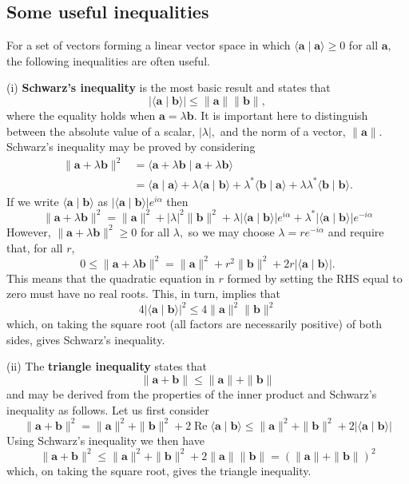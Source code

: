 \documentclass[12pt]{book}
\theoremstyle{definition}\newtheorem{dfn}{Définition}[chapter]
\theoremstyle{plain}\newtheorem{thm}{Théorème}[chapter]
\theoremstyle{plain}\newtheorem{prp}{Proposition}[chapter]
\theoremstyle{plain}\newtheorem{lem}{\bf Lemme}[chapter]
\theoremstyle{plain}\newtheorem{axm}{\bf Axiome}[chapter]
\theoremstyle{plain}\newtheorem{lmm}{\bf Lemme}[chapter]
\theoremstyle{plain}\newtheorem{cor}{\bf Corollaire}[chapter]
\theoremstyle{remark}\newtheorem{rem}{Remarque}[chapter]
\begin{document}
\subsection{Some useful inequalities}
For a set of vectors forming a linear vector space in which $\langle\mathbf{a} \mid \mathbf{a}\rangle \geq 0$ for all $\mathbf{a},$ the following inequalities are often useful.

(i) {\bf Schwarz's inequality} is the most basic result and states that
$$
|\langle\mathbf{a} \mid \mathbf{b}\rangle| \leq\|\mathbf{a}\|\|\mathbf{b}\|,
$$
where the equality holds when $\mathbf{a}=\lambda \mathbf{b}$. It is important here to distinguish between the absolute value of a scalar, $|\lambda|,$ and the norm of a vector, $\|\mathbf{a}\| .$ Schwarz's inequality may be proved by considering
$$
\begin{aligned}
\|\mathbf{a}+\lambda \mathbf{b}\|^{2} &=\langle\mathbf{a}+\lambda \mathbf{b} \mid \mathbf{a}+\lambda \mathbf{b}\rangle \\
&=\langle\mathbf{a} \mid \mathbf{a}\rangle+\lambda\langle\mathbf{a} \mid \mathbf{b}\rangle+\lambda^{*}\langle\mathbf{b} \mid \mathbf{a}\rangle+\lambda \lambda^{*}\langle\mathbf{b} \mid \mathbf{b}\rangle .
\end{aligned}
$$
If we write $\langle\mathbf{a} \mid \mathbf{b}\rangle$ as $|\langle\mathbf{a} \mid \mathbf{b}\rangle| e^{i \alpha}$ then
$$
\|\mathbf{a}+\lambda \mathbf{b}\|^{2}=\|\mathbf{a}\|^{2}+|\lambda|^{2}\|\mathbf{b}\|^{2}+\lambda|\langle\mathbf{a} \mid \mathbf{b}\rangle| e^{i \alpha}+\lambda^{*}|\langle\mathbf{a} \mid \mathbf{b}\rangle| e^{-i \alpha}
$$
However, $\|\mathbf{a}+\lambda \mathbf{b}\|^{2} \geq 0$ for all $\lambda,$ so we may choose $\lambda=r e^{-i \alpha}$ and require that, for all $r$,
$$
0 \leq\|\mathbf{a}+\lambda \mathbf{b}\|^{2}=\|\mathbf{a}\|^{2}+r^{2}\|\mathbf{b}\|^{2}+2 r|\langle\mathbf{a} \mid \mathbf{b}\rangle| .
$$
This means that the quadratic equation in $r$ formed by setting the RHS equal to zero must have no real roots. This, in turn, implies that $$
4|\langle\mathbf{a} \mid \mathbf{b}\rangle|^{2} \leq 4\|\mathbf{a}\|^{2}\|\mathbf{b}\|^{2}
$$
which, on taking the square root (all factors are necessarily positive) of both sides, gives Schwarz's inequality.

(ii) The {\bf triangle inequality} states that
$$
\|\mathbf{a}+\mathbf{b}\| \leq\|\mathbf{a}\|+\|\mathbf{b}\|
$$
and may be derived from the properties of the inner product and Schwarz's inequality as follows. Let us first consider
$$
\|\mathbf{a}+\mathbf{b}\|^{2}=\|\mathbf{a}\|^{2}+\|\mathbf{b}\|^{2}+2 \operatorname{Re}\langle\mathbf{a} \mid \mathbf{b}\rangle \leq\|\mathbf{a}\|^{2}+\|\mathbf{b}\|^{2}+2|\langle\mathbf{a} \mid \mathbf{b}\rangle|
$$
Using Schwarz's inequality we then have
$$
\|\mathbf{a}+\mathbf{b}\|^{2} \leq\|\mathbf{a}\|^{2}+\|\mathbf{b}\|^{2}+2\|\mathbf{a}\|\|\mathbf{b}\|=(\|\mathbf{a}\|+\|\mathbf{b}\|)^{2}
$$
which, on taking the square root, gives the triangle inequality.
\end{document}

